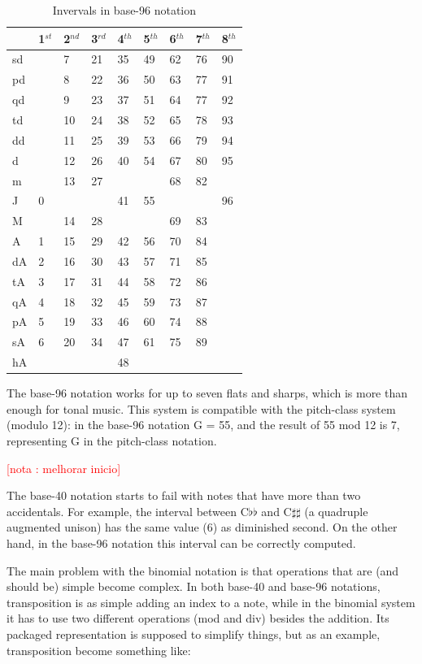 \documentclass{article}
\newcounter{notacounter}
\newcommand{\nota}[1]{
  \addtocounter{notacounter}{1}
  \textcolor{red}{[nota \arabic{notacounter}: #1]}
}
\begin{document}
\begin{table}
  \centering
  \begin{tabular}{l|llllllll}
    & 1$^{st}$& 2$^{nd}$& 3$^{rd}$& 4$^{th}$& 5$^{th}$& 6$^{th}$& 7$^{th}$& 8$^{th}$ \\
    \hline
    sd  &  & 7&21&35&49&62&76&90 \\
    pd  &  & 8&22&36&50&63&77&91 \\
    qd  &  & 9&23&37&51&64&77&92 \\
    td  &  &10&24&38&52&65&78&93 \\
    dd  &  &11&25&39&53&66&79&94 \\
    d   &  &12&26&40&54&67&80&95 \\
    m   &  &13&27&  &  &68&82&   \\
    J   & 0&  &  &41&55&  &  &96 \\
    M   &  &14&28&  &  &69&83&   \\
    A   & 1&15&29&42&56&70&84&   \\
    dA  & 2&16&30&43&57&71&85&   \\
    tA  & 3&17&31&44&58&72&86&   \\
    qA  & 4&18&32&45&59&73&87&   \\
    pA  & 5&19&33&46&60&74&88&   \\
    sA  & 6&20&34&47&61&75&89&   \\
    hA  &  &  &  &48&  &  &  &   
  \end{tabular}
  \caption{Invervals in base-96 notation}
  \label{tab:jama-intervalos}
\end{table}

The base-96 notation works for up to seven flats and sharps, which is
more than enough for tonal music. This system is compatible with the
pitch-class system (modulo 12): in the base-96 notation G = 55, and
the result of 55 mod 12 is 7, representing G in the pitch-class
notation. 

\nota{melhorar inicio}
The base-40 notation starts to fail with notes that have more than two
accidentals. For example, the interval between C$\flat\flat$ and
C$\sharp\sharp$ (a quadruple augmented unison) has the same value (6)
as diminished second. On the other hand, in the base-96 notation this
interval can be correctly computed.

The main problem with the binomial notation is that operations that
are (and should be) simple become complex. In both base-40 and base-96
notations, transposition is as simple adding an index to a note, while
in the binomial system it has to use two different operations (mod and
div) besides the addition. Its packaged representation is supposed to
simplify things, but as an example, transposition become something
like:
\end{document}
